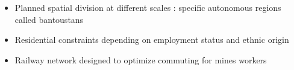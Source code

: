 \documentclass[english,11pt]{beamer}
\begin{document}
{\begin{itemize}
\item Planned spatial division at different scales : specific autonomous regions called bantoustans
\item Residential constraints depending on employment status and ethnic origin
\item Railway network designed to optimize commuting for mines workers

\end{itemize}}
\end{document}
